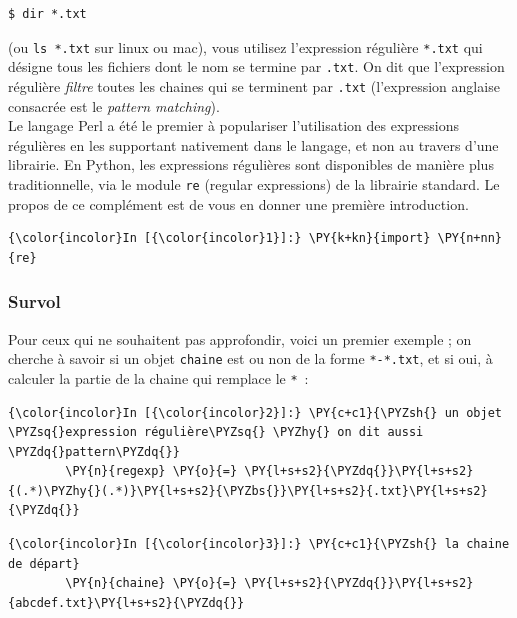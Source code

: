\begin{verbatim}
$ dir *.txt
\end{verbatim}

(ou \texttt{ls\ *.txt} sur linux ou mac), vous utilisez l'expression
régulière \texttt{*.txt} qui désigne tous les fichiers dont le nom se
termine par \texttt{.txt}. On dit que l'expression régulière
\emph{filtre} toutes les chaines qui se terminent par \texttt{.txt}
(l'expression anglaise consacrée est le \emph{pattern matching}).\\

    Le langage Perl a été le premier à populariser l'utilisation des
expressions régulières en les supportant nativement dans le langage, et
non au travers d'une librairie. En Python, les expressions régulières
sont disponibles de manière plus traditionnelle, via le module
\texttt{re} (regular expressions) de la librairie standard. Le propos de
ce complément est de vous en donner une première introduction.

    \begin{Verbatim}[commandchars=\\\{\}]
{\color{incolor}In [{\color{incolor}1}]:} \PY{k+kn}{import} \PY{n+nn}{re}
\end{Verbatim}


    \hypertarget{survol}{%
\subsubsection{Survol}\label{survol}}

    Pour ceux qui ne souhaitent pas approfondir, voici un premier exemple ;
on cherche à savoir si un objet \texttt{chaine} est ou non de la forme
\texttt{*-*.txt}, et si oui, à calculer la partie de la chaine qui
remplace le \texttt{*}~:

    \begin{Verbatim}[commandchars=\\\{\}]
{\color{incolor}In [{\color{incolor}2}]:} \PY{c+c1}{\PYZsh{} un objet \PYZsq{}expression régulière\PYZsq{} \PYZhy{} on dit aussi \PYZdq{}pattern\PYZdq{}}
        \PY{n}{regexp} \PY{o}{=} \PY{l+s+s2}{\PYZdq{}}\PY{l+s+s2}{(.*)\PYZhy{}(.*)}\PY{l+s+s2}{\PYZbs{}}\PY{l+s+s2}{.txt}\PY{l+s+s2}{\PYZdq{}}
\end{Verbatim}


    \begin{Verbatim}[commandchars=\\\{\}]
{\color{incolor}In [{\color{incolor}3}]:} \PY{c+c1}{\PYZsh{} la chaine de départ}
        \PY{n}{chaine} \PY{o}{=} \PY{l+s+s2}{\PYZdq{}}\PY{l+s+s2}{abcdef.txt}\PY{l+s+s2}{\PYZdq{}}
\end{Verbatim}


